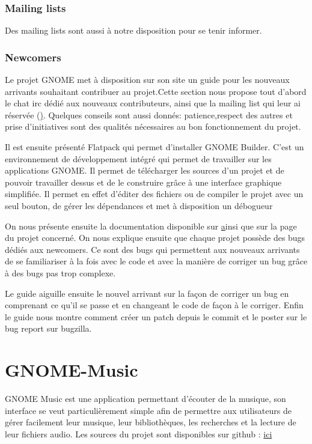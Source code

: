 \documentclass[12pt]{report}
\begin{document}
\subsection{Mailing lists}
Des mailing lists sont aussi à notre disposition pour se tenir informer.

\subsection{Newcomers}
Le projet GNOME met à disposition sur son site un guide pour les nouveaux
arrivants souhaitant contribuer au projet.Cette section nous propose
tout d'abord le chat irc dédié aux nouveaux contributeurs, ainsi que la
mailing list qui leur ai réservée
(\href{https://mail.gnome.org/mailman/listinfo/newscomers-list}).
Quelques conseils sont aussi donnés: patience,respect des autres et prise
d'initiatives sont des qualités nécessaires au bon fonctionnement du projet.

Il est ensuite présenté Flatpack qui permet d'installer GNOME Builder.
C'est un environnement de développement intégré qui permet de travailler
sur les applications GNOME. Il permet de télécharger les sources d'un
projet et de pouvoir travailler dessus et de le construire grâce à une
interface graphique simplifiée. Il permet en effet d'éditer des fichiers
ou de compiler le projet avec un seul bouton, de gérer les dépendances
et met à disposition un débogueur

On nous présente ensuite la documentation disponible sur
\href{https://developper.gnome.org/search} ainsi que sur la page du
projet concerné. On nous explique ensuite que chaque projet possède
des bugs dédiés aux newcomers. Ce sont des bugs qui permettent aux
nouveaux arrivants de se familiariser à la fois avec le code et
avec la manière de corriger un bug grâce à des bugs pas trop
complexe.

Le guide aiguille ensuite le nouvel arrivant sur la façon de corriger
un bug en comprenant ce qu'il se passe et en changeant le code de
façon à le corriger. Enfin le guide nous montre comment créer un
patch depuis le commit et le poster sur le bug report sur bugzilla.


\newpage
\chapter{GNOME-Music}
GNOME Music est une application permettant d'écouter de la musique, 
son interface se veut particulièrement simple afin de permettre aux
utilisateurs de gérer facilement leur musique, leur bibliothèques, 
les recherches et la lecture de leur fichiers audio.
Les sources du projet sont disponibles sur github :
\href{https://github.com/GNOME/gnome-music}{ici}
\end{document}
